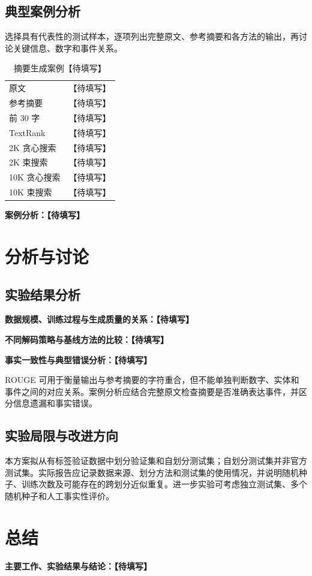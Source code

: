\documentclass{sdxxpaper}
\begin{document}
\subsection{典型案例分析}
选择具有代表性的测试样本，逐项列出完整原文、参考摘要和各方法的输出，再讨论关键信息、数字和事件关系。
\begin{table}[htbp]
\centering\caption{摘要生成案例【待填写】}\label{tab:case}
\begin{tabularx}{\linewidth}{@{}>{\raggedright\arraybackslash}p{6em}X@{}}\toprule
原文 & 【待填写】\\
参考摘要 & 【待填写】\\
前 30 字 & 【待填写】\\
TextRank & 【待填写】\\
2K 贪心搜索 & 【待填写】\\
2K 束搜索 & 【待填写】\\
10K 贪心搜索 & 【待填写】\\
10K 束搜索 & 【待填写】\\\bottomrule
\end{tabularx}
\end{table}
\noindent\textbf{案例分析：【待填写】}

\section{分析与讨论}
\subsection{实验结果分析}
\noindent\textbf{数据规模、训练过程与生成质量的关系：【待填写】}\par
\noindent\textbf{不同解码策略与基线方法的比较：【待填写】}\par
\noindent\textbf{事实一致性与典型错误分析：【待填写】}

ROUGE 可用于衡量输出与参考摘要的字符重合，但不能单独判断数字、实体和事件之间的对应关系。案例分析应结合完整原文检查摘要是否准确表达事件，并区分信息遗漏和事实错误。

\subsection{实验局限与改进方向}
本方案拟从有标签验证数据中划分验证集和自划分测试集；自划分测试集并非官方测试集。实际报告应记录数据来源、划分方法和测试集的使用情况，并说明随机种子、训练次数及可能存在的跨划分近似重复。进一步实验可考虑独立测试集、多个随机种子和人工事实性评价。

\section{总结}
\noindent\textbf{主要工作、实验结果与结论：【待填写】}
\end{document}
